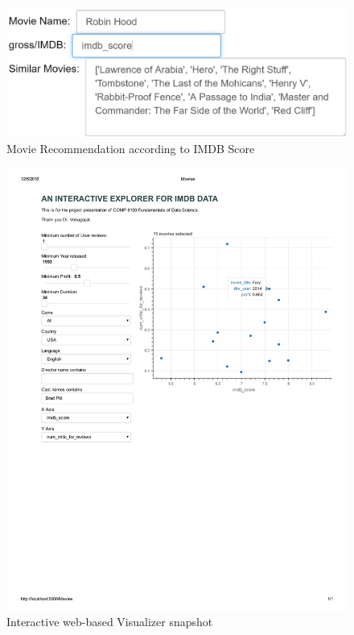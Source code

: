 \documentclass{article}%
\begin{document}
\begin{figure}
\centering
\includegraphics[width=1.0\columnwidth]{Fig/suggestionimdbscore.PNG}
\caption{Movie Recommendation according to IMDB Score}
\label{fig:suggestionimdbscore}
\end{figure}

\begin{figure}
\centering
\includegraphics[width=1.0\columnwidth]{Fig/webvisualizer.pdf}
\caption{Interactive web-based Visualizer snapshot}
\label{fig:webvisualizer}
\end{figure}
\end{document}
